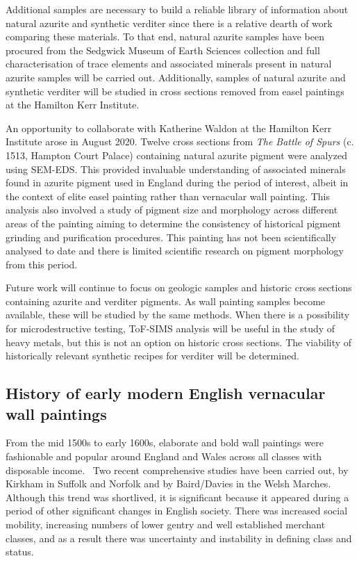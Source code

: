 Additional samples are necessary to build a reliable library of information about natural azurite and synthetic verditer since there is a relative dearth of work comparing these materials. To that end, natural azurite samples have been procured from the Sedgwick Museum of Earth Sciences collection and full characterisation of trace elements and associated minerals present in natural azurite samples will be carried out. Additionally, samples of natural azurite and synthetic verditer will be studied in cross sections removed from easel paintings at the Hamilton Kerr Institute.

An opportunity to collaborate with Katherine Waldon at the Hamilton Kerr Institute arose in August 2020. Twelve cross sections from \textit{The Battle of Spurs} (c. 1513, Hampton Court Palace) containing natural azurite pigment were analyzed using SEM-EDS. This provided invaluable understanding of associated minerals found in azurite pigment used in England during the period of interest, albeit in the context of elite easel painting rather than vernacular wall painting. This analysis also involved a study of pigment size and morphology across different areas of the painting aiming to determine the consistency of historical pigment grinding and purification procedures. This painting has not been scientifically analysed to date and there is limited scientific research on pigment morphology from this period.

Future work will continue to focus on geologic samples and historic cross sections containing azurite and verditer pigments. As wall painting samples become available, these will be studied by the same methods. When there is a possibility for microdestructive testing, ToF-SIMS analysis will be useful in the study of heavy metals, but this is not an option on historic cross sections. The viability of historically relevant synthetic recipes for verditer will be determined.

\subsection[History of early modern English wall paintings]{History of early modern English vernacular wall paintings}
\label{subsection1.1.2}

From the mid 1500s to early 1600s, elaborate and bold wall paintings were fashionable and popular around England and Wales across all classes with disposable income.~\autocite{Baird_thesis,Davies_book,Kirkham_thesis} Two recent comprehensive studies have been carried out, by Kirkham in Suffolk and Norfolk and by Baird/Davies in the Welsh Marches. Although this trend was shortlived, it is significant because it appeared during a period of other significant changes in English society. There was increased social mobility, increasing numbers of lower gentry and well established merchant classes, and as a result there was uncertainty and instability in defining class and status.~\autocite{Baird_thesis} 

